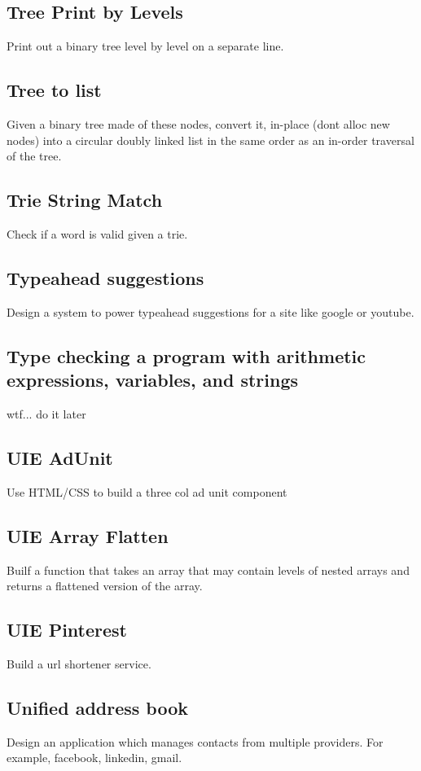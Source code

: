 \documentclass{llncs}
\begin{document}
\subsection{Tree Print by Levels}
Print out a binary tree level by level on a separate line.

\subsection{Tree to list}
Given a binary tree made of these nodes, convert it, in-place (dont alloc new nodes) into a circular doubly linked list in the same order as an in-order traversal of the tree.

\subsection{Trie String Match}
Check if a word is valid given a trie.

\subsection{Typeahead suggestions}
Design a system to power typeahead suggestions for a site like google or youtube.

\subsection{Type checking a program with arithmetic expressions, variables, and strings}
wtf... do it later

\subsection{UIE AdUnit}
Use HTML/CSS to build a three col ad unit component

\subsection{UIE Array Flatten}
Builf a function that takes an array that may contain levels of nested arrays and returns a flattened version of the array.

\subsection{UIE Pinterest}
Build a url shortener service.

\subsection{Unified address book}
Design an application which manages contacts from multiple providers. For example, facebook, linkedin, gmail.
\end{document}
